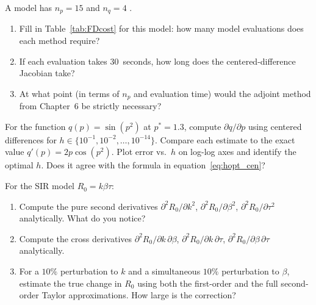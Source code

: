 \begin{exercise}[\bloom{L3}]
\label{ex:ch3:cost}
A model has $n_p = 15$ \POIs and $n_q = 4$ \QOIs.
\begin{enumerate}[label=(\alph*)]
  \item Fill in Table~\ref{tab:FDcost} for this model:
        how many model evaluations does each method require?
  \item If each evaluation takes 30~seconds,
        how long does the centered-difference Jacobian take?
  \item At what point (in terms of $n_p$ and evaluation time)
        would the adjoint method from Chapter~6 be strictly necessary?
\end{enumerate}
\end{exercise}

\begin{exercise}[\bloom{L3}]
\label{ex:ch3:ucurve_matlab}
For the function $q(p) = \sin(p^2)$ at $p^* = 1.3$,
compute $\partial q/\partial p$ using centered differences
for $h \in \{10^{-1}, 10^{-2}, \ldots, 10^{-14}\}$.
Compare each estimate to the exact value $q'(p) = 2p\cos(p^2)$.
Plot error vs.\ $h$ on log-log axes and identify the optimal $h$.
Does it agree with the formula in equation~\eqref{eq:hopt_cen}?
\end{exercise}

\begin{exercise}[\bloom{L3}]
\label{ex:ch3:second}
For the SIR model $R_0 = k\beta\tau$:
\begin{enumerate}[label=(\alph*)]
  \item Compute the pure second derivatives $\partial^2 R_0/\partial k^2$,
        $\partial^2 R_0/\partial\beta^2$, $\partial^2 R_0/\partial\tau^2$
        analytically. What do you notice?
  \item Compute the cross derivatives $\partial^2 R_0/\partial k\,\partial\beta$,
        $\partial^2 R_0/\partial k\,\partial\tau$,
        $\partial^2 R_0/\partial\beta\,\partial\tau$ analytically.
  \item For a $10\%$ perturbation to $k$ and a simultaneous $10\%$ perturbation
        to $\beta$, estimate the true change in $R_0$ using both the
        first-order and the full second-order Taylor approximations.
        How large is the correction?
\end{enumerate}
\end{exercise}

